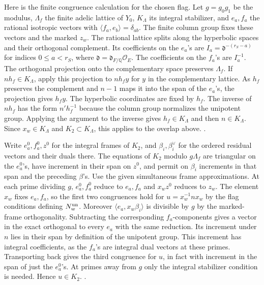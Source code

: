 Here is the finite congruence calculation for the chosen flag.
Let \(g=g_0g_1\) be the modulus, \(\Lambda_f\) the finite
adelic lattice of \(Y_0\), \(K_\Lambda\) its integral stabilizer,
and \(e_a,f_a\) the rational isotropic vectors with
\(\langle f_a,e_b\rangle=\delta_{ab}\). The finite column group
fixes these vectors and the marked \(z_w\).
The rational lattice splits along the hyperbolic spaces and their
orthogonal complement. Its coefficients on the \(e_a\)'s are
\(I_a=\mathfrak d^{-(r_S-a)}\) for indices \(0\le a<r_S\),
where \(\mathfrak d=\mathfrak d_{F/\mathbb Q}\mathcal O_E\).
The coefficients on the \(f_a\)'s are \(I_a^{-1}\).
The orthogonal projection onto the complementary space preserves
\(\Lambda_f\). If \(nh_f\in K_\Lambda\), apply this projection
to \(nh_f y\) for \(y\) in the complementary lattice.
As \(h_f\) preserves the complement and \(n-1\) maps it into
the span of the \(e_a\)'s, the projection gives \(h_f y\).
The hyperbolic coordinates are fixed by \(h_f\).
The inverse of \(nh_f\) has the form \(n'h_f^{-1}\)
because the column group normalizes the unipotent group.
Applying the argument to the inverse gives \(h_f\in K_\Lambda\)
and then \(n\in K_\Lambda\). Since \(x_w\in K_\Lambda\)
and \(K_2\subset K_\Lambda\), this applies to the overlap above.
.

Write \(e^0_a,f^0_a,z^0\) for the integral frames of \(K_2\),
and \(\beta_i,\beta_i^\vee\) for the ordered residual vectors and
their duals there. The equations of \(K_2\) modulo \(g\Lambda_f\)
are triangular on the \(e^0_a\)'s, have increment in their span
on \(z^0\), and permit on \(\beta_i\) increments in that span
and the preceding \(\beta\)'s. Use the given simultaneous frame
approximations. At each prime dividing \(g\), \(e^0_a,f^0_a\)
reduce to \(e_a,f_a\) and \(x_w z^0\) reduces to \(z_w\).
The element \(x_w\) fixes \(e_a,f_a\), so the first two
congruences hold for \(u=x_w^{-1}nx_w\) by the flag
conditions defining \(N_w^{\rm un}\).
Moreover \(\langle e_a,x_w\beta_i\rangle\) is divisible by
\(g\) by the marked-frame orthogonality. Subtracting the
corresponding \(f_a\)-components gives a vector in the exact
orthogonal to every \(e_a\) with the same reduction. Its
increment under \(n\) lies in their span by definition of the
unipotent group. This increment has integral coefficients, as
the \(f_a\)'s are integral dual vectors at these primes.
Transporting back gives the third congruence for \(u\), in
fact with increment in the span of just the \(e^0_a\)'s.
At primes away from \(g\) only the integral stabilizer condition
is needed. Hence \(u\in K_2\).
.

